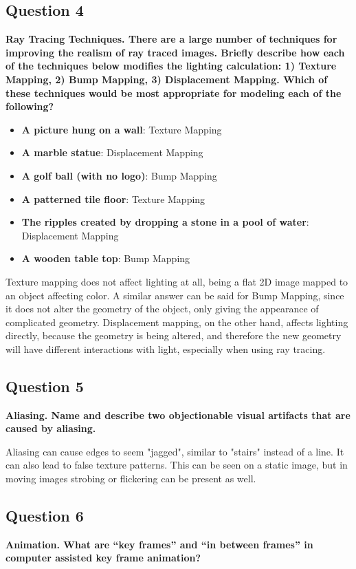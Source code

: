 \documentclass[12pt]{article}
\begin{document}
\subsection*{Question 4}
{\bfseries Ray Tracing Techniques. There are a large number of techniques for improving the realism of ray traced images. Briefly describe how each of the techniques below modifies the lighting calculation: 1) Texture Mapping, 2) Bump Mapping, 3) Displacement Mapping. Which of these techniques would be most appropriate for modeling each of the following?}
\begin{itemize}
    \item \textbf{A picture hung on a wall}: Texture Mapping
    \item \textbf{A marble statue}: Displacement Mapping
    \item \textbf{A golf ball (with no logo)}: Bump Mapping
    \item \textbf{A patterned tile floor}: Texture Mapping
    \item \textbf{The ripples created by dropping a stone in a pool of water}: Displacement Mapping
    \item \textbf{A wooden table top}: Bump Mapping
\end{itemize}

Texture mapping does not affect lighting at all, being a flat 2D image mapped to an object affecting color. A similar answer can be said for Bump Mapping, since it does not alter the geometry of the object, only giving the appearance of complicated geometry. Displacement mapping, on the other hand, affects lighting directly, because the geometry is being altered, and therefore the new geometry will have different interactions with light, especially when using ray tracing.

\subsection*{Question 5}
{\bfseries Aliasing. Name and describe two objectionable visual artifacts that are caused by aliasing.}

Aliasing can cause edges to seem "jagged", similar to "stairs" instead of a line. It can also lead to false texture patterns. This can be seen on a static image, but in moving images strobing or flickering can be present as well.

\subsection*{Question 6}
{\bfseries Animation. What are “key frames” and “in between frames” in computer assisted key frame animation?}
\end{document}
